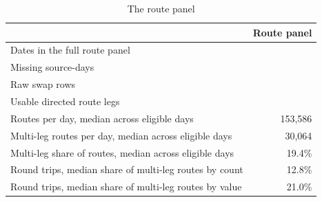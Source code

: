 \begin{table}[htbp]
\centering
\small
\caption{The route panel}
\label{tab:panel}
\begin{tabular}{lr}
\toprule
 & Route panel \\
\midrule
Dates in the full route panel & \RoutePanelCalendarDates{} \\
Missing source-days & \RoutePanelMissingSourceDays{} \\
Raw swap rows & \RoutePanelRawSwapsExact{} \\
Usable directed route legs & \RoutePanelUsableLegsExact{} \\
Routes per day, median across eligible days & 153,586 \\
Multi-leg routes per day, median across eligible days & 30,064 \\
Multi-leg share of routes, median across eligible days & 19.4\% \\
Round trips, median share of multi-leg routes by count & 12.8\% \\
Round trips, median share of multi-leg routes by value & 21.0\% \\
\bottomrule
\end{tabular}
\end{table}
